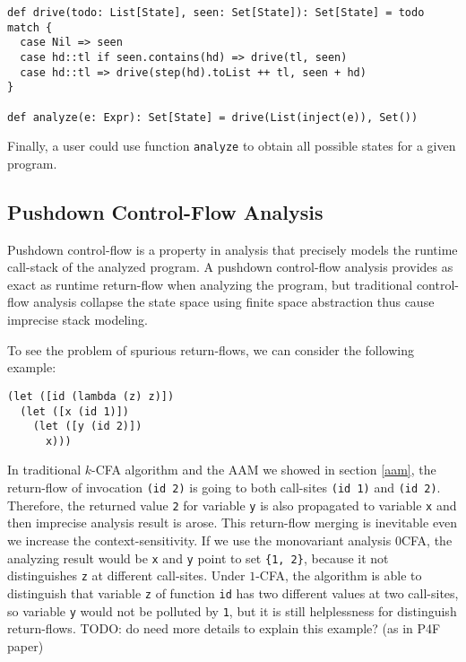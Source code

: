\documentclass[acmsmall,review,anonymous]{acmart}\settopmatter{printfolios=true,printccs=false,printacmref=false}
\begin{document}
\begin{verbatim}
def drive(todo: List[State], seen: Set[State]): Set[State] = todo match {
  case Nil => seen
  case hd::tl if seen.contains(hd) => drive(tl, seen)
  case hd::tl => drive(step(hd).toList ++ tl, seen + hd)
}

def analyze(e: Expr): Set[State] = drive(List(inject(e)), Set())
\end{verbatim}

Finally, a user could use function \texttt{analyze} to obtain all possible states 
for a given program.


\subsection{Pushdown Control-Flow Analysis}

Pushdown control-flow is a property in analysis that precisely models
the runtime call-stack of the analyzed program. 
A pushdown control-flow analysis provides as exact as runtime return-flow 
when analyzing the program, but traditional control-flow analysis collapse 
the state space using finite space abstraction thus cause imprecise stack modeling.

To see the problem of spurious return-flows, we can consider the following example:

\begin{verbatim}
(let ([id (lambda (z) z)])
  (let ([x (id 1)])
    (let ([y (id 2)])
      x)))
\end{verbatim}

In traditional $k$-CFA algorithm and the AAM we showed in section \ref{aam}, 
the return-flow of invocation \texttt{(id 2)} 
is going to both call-sites \texttt{(id 1)} and \texttt{(id 2)}. Therefore, the
returned value \texttt{2} for variable \texttt{y} is also propagated to 
variable \texttt{x} and then imprecise analysis result is arose.
This return-flow merging is inevitable even we increase the context-sensitivity.
If we use the monovariant analysis 0CFA, the analyzing result would be \texttt{x} and 
\texttt{y} point to set \texttt{\{1, 2\}}, because it not distinguishes
\texttt{z} at different call-sites.
Under $1$-CFA, the algorithm is able to distinguish that variable \texttt{z} of function
\texttt{id} has two different values at two call-sites, so variable \texttt{y} 
would not be polluted by \texttt{1}, but it is still helplessness for distinguish
return-flows.
TODO: do need more details to explain this example? (as in P4F paper)
\end{document}
